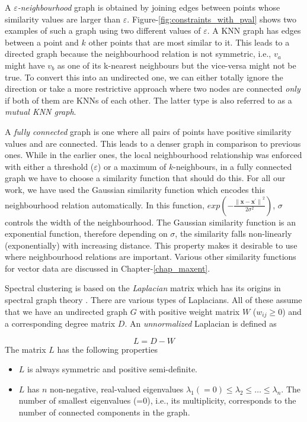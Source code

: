 A \textit{$\varepsilon$-neighbourhood} graph is obtained by joining edges between points whose similarity values are larger than  $\varepsilon$. Figure-\ref{fig:constraints_with_pval} shows two examples of such a graph using two different values of $\varepsilon$. A \ac{KNN} graph has edges between a point and $k$ other points that are most similar to it. This leads to a directed graph because the neighbourhood relation is not symmetric, i.e., $v_{a}$ might have $v_{b}$ as one of its k-nearest neighbours but the vice-versa might not be true. To convert this into an undirected one, we can either totally ignore the direction or take a more restrictive approach where two nodes are connected \textit{only} if both of them are \aclp{KNN} of each other. The latter type is also referred to as a \textit{mutual \acl{KNN} graph}.

A \textit{fully connected} graph is one where all pairs of points have positive similarity values and are connected. This leads to a denser graph in comparison to previous ones. While in the earlier ones, the local neighbourhood relationship was enforced with either a threshold ($\varepsilon$) or a maximum of $k$-neighbours, in a fully connected graph we have to choose a similarity function that should do this. For all our work, we have used the Gaussian similarity function which encodes this neighbourhood relation automatically. In this function, $exp \left( -\frac{{\parallel \textbf{x}-\textbf{x}^{'} \parallel}^{2}}{2\sigma^{2}}\right)$, $\sigma$ controls the width of the neighbourhood. The Gaussian similarity function is an exponential function, therefore depending on $\sigma$, the similarity falls non-linearly (exponentially) with increasing distance. This property makes it desirable to use where neighbourhood relations are important. Various other similarity functions for vector data are discussed in Chapter-\ref{chap_maxent}.

Spectral clustering is based on the \textit{Laplacian} matrix which has its origins in spectral graph theory \citep{chung1997spectralgraph}. There are various types of Laplacians. All of these assume that we have an undirected graph $G$ with positive weight matrix $W$ ($w_{ij} \geq 0$) and a corresponding degree matrix $D$. An \textit{unnormalized} Laplacian is defined as 

\[
	L = D-W
\] 
The matrix $L$ has the following properties
\begin{itemize}
    \item $L$ is always symmetric and positive semi-definite.
    \item $L$ has $n$ non-negative, real-valued eigenvalues $\lambda_{1}(=0) \leq \lambda_{2}\leq \dots \leq \lambda_{n}$. The number of smallest eigenvalues (=0), i.e., its multiplicity, corresponds to the number of connected components in the graph. 
\end{itemize}

